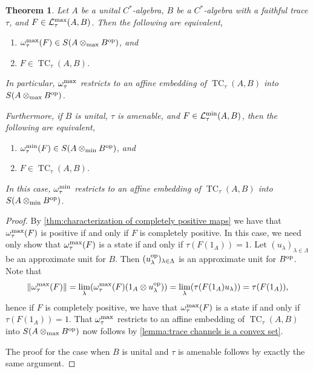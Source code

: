 \documentclass[11pt, a4paper, oneside, final, reqno]{amsart}
\newcommand{\calL}{\mathcal{L}}
\newcommand{\TC}{\operatorname{TC}}
\theoremstyle{definition}
\theoremstyle{plain}
\newtheorem{theorem}[definition]{Theorem}
\theoremstyle{remark}
\numberwithin{equation}{section}
\begin{document}
\begin{theorem}\label{thm:maps with states as associated functionals}
    Let $A$ be a unital $C^*$-algebra, $B$ be a $C^*$-algebra with a faithful
    trace
    $\tau$, and $F \in \calL_\tau^{\rm max}(A,B)$. Then the following are equivalent,
    \begin{enumerate}
        \item $\omega_\tau^{\rm max}(F) \in S(A \otimes_{\rm max} B^{\rm op})$, and
        \item $F \in \TC_\tau(A,B)$.
    \end{enumerate}
    In particular, $\omega_\tau^{\rm max}$ restricts to an affine embedding of $\TC_\tau(A,B)$ into $S(A \otimes_{\rm max} B^{\rm op})$.

    Furthermore, if $B$ is unital, $\tau$ is amenable, and $F \in \calL_\tau^{\rm min}(A,B)$, then the following are equivalent,
    \begin{enumerate}
        \item $\omega_\tau^{\rm min}(F) \in S(A \otimes_{\rm min} B^{\rm op})$, and
        \item $F \in \TC_\tau(A,B)$.
    \end{enumerate}
    In this case, $\omega_\tau^{\rm min}$ restricts to an affine embedding of $\TC_\tau(A,B)$ into $S(A \otimes_{\rm min} B^{\rm op})$.
\end{theorem}
\begin{proof}
    By \cref{thm:characterization of completely positive maps} we have that $\omega_\tau^{\rm max}(F)$ is positive if and only if $F$ is completely positive. In this case, we need only show that $\omega_\tau^{\rm max}(F)$ is a state if and only if $\tau(F(1_A)) = 1$. Let $(u_\lambda)_{\lambda \in \Lambda}$ be an approximate unit for $B$. Then $(u_\lambda^{\rm op})_{\lambda \in \Lambda}$ is an approximate unit for $B^{\rm op}$. Note that
    \begin{equation*}
        \|\omega_\tau^{\rm max}(F)\|
        = \lim\limits_{\lambda} (\omega_\tau^{\rm max}(F)(1_A \otimes u_\lambda^{\rm op}))
        = \lim\limits_{\lambda} (\tau(F(1_A)u_\lambda))
        = \tau(F(1_A)),
    \end{equation*}
    hence if $F$ is completely positive, we have that $\omega_\tau^{\rm max}(F)$ is a state if and only if $\tau(F(1_A)) = 1$. That $\omega_\tau^{\rm max}$ restricts to an affine embedding of $\TC_\tau(A,B)$ into $S(A \otimes_{\rm max} B^{\rm op})$ now follows by \cref{lemma:trace channels is a convex set}.

    The proof for the case when $B$ is unital and $\tau$ is amenable follows by exactly the same argument.
\end{proof}
\end{document}
